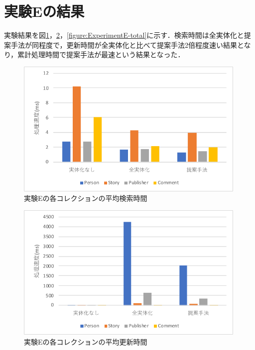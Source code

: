 \documentclass[a4paper,11pt]{ujreport}
\begin{document}
\section{実験Eの結果}
実験結果を図\ref{figure:ExperimentE-find}，\ref{figure:ExperimentE-update}，\ref{figure:ExperimentE-total}に示す．検索時間は全実体化と提案手法が同程度で，更新時間が全実体化と比べて提案手法2倍程度速い結果となり，累計処理時間で提案手法が最速という結果となった．
\begin{figure}[htbp]
	\begin{center}
		\includegraphics[width=30em]{src/ExperimentE-find.pdf} %
	\end{center}
	\caption{実験Eの各コレクションの平均検索時間}
	\label{figure:ExperimentE-find}
\end{figure}
\begin{figure}[htbp]
	\begin{center}
		\includegraphics[width=30em]{src/ExperimentE-update.pdf} %
	\end{center}
	\caption{実験Eの各コレクションの平均更新時間}
	\label{figure:ExperimentE-update}
\end{figure}
\end{document}
